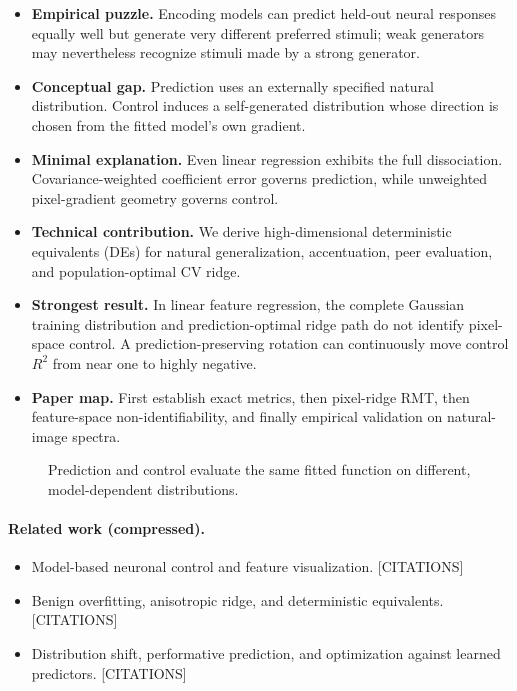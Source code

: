 \documentclass{article}
\begin{document}
\begin{itemize}[leftmargin=1.3em]
  \item \textbf{Empirical puzzle.} Encoding models can predict held-out neural
        responses equally well but generate very different preferred stimuli;
        weak generators may nevertheless recognize stimuli made by a strong
        generator.
  \item \textbf{Conceptual gap.} Prediction uses an externally specified
        natural distribution. Control induces a self-generated distribution
        whose direction is chosen from the fitted model's own gradient.
  \item \textbf{Minimal explanation.} Even linear regression exhibits the
        full dissociation. Covariance-weighted coefficient error governs
        prediction, while unweighted pixel-gradient geometry governs control.
  \item \textbf{Technical contribution.} We derive high-dimensional
        deterministic equivalents (DEs) for natural generalization,
        accentuation, peer evaluation, and population-optimal CV ridge.
  \item \textbf{Strongest result.} In linear feature regression, the complete
        Gaussian training distribution and prediction-optimal ridge path do
        not identify pixel-space control. A prediction-preserving rotation can
        continuously move control $R^2$ from near one to highly negative.
  \item \textbf{Paper map.} First establish exact metrics, then pixel-ridge
        RMT, then feature-space non-identifiability, and finally empirical
        validation on natural-image spectra.
\end{itemize}

\begin{figure}[t]
  \centering
  \caption{Prediction and control evaluate the same fitted function on
  different, model-dependent distributions.}
  \label{fig:motivation}
\end{figure}

\paragraph{Related work (compressed).}
\begin{itemize}[leftmargin=1.3em,itemsep=1pt,topsep=2pt]
  \item Model-based neuronal control and feature visualization. [CITATIONS]
  \item Benign overfitting, anisotropic ridge, and deterministic equivalents.
        [CITATIONS]
  \item Distribution shift, performative prediction, and optimization against
        learned predictors. [CITATIONS]
\end{itemize}
\end{document}
